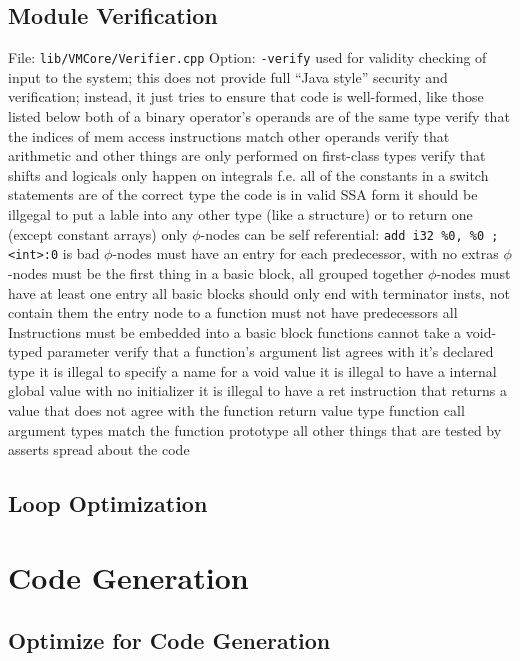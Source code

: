 \documentclass{myproc}
\begin{document}
\subsection{Module Verification}
\bit
\w File: \verb+lib/VMCore/Verifier.cpp+
\w Option: \verb+-verify+
\w used for validity checking of input to the system; this does not provide
full ``Java style'' security and verification; instead, it just tries to
ensure that code is well-formed, like those listed below
\eit
  \ben
  \w both of a binary operator's operands are of the same type
  \w verify that the indices of mem access instructions match other operands
  \w verify that arithmetic and other things are only performed on first-class
  types 
  \w verify that shifts and logicals only happen on integrals f.e.
  \w all of the constants in a switch statements are of the correct type
  \w the code is in valid SSA form
  \w it should be illgegal to put a lable into any other type (like a
  structure) or to return one (except constant arrays)
  \w only $\phi$-nodes can be self referential:
  \verb+add i32 %0, %0 ; <int>:0+ is bad 
  \w $\phi$-nodes must have an entry for each predecessor, with no extras
  \w $\phi$-nodes must be the first thing in a basic block, all grouped together
  \w $\phi$-nodes must have at least one entry
  \w all basic blocks should only end with terminator insts, not contain them
  \w the entry node to a function must not have predecessors
  \w all Instructions must be embedded into a basic block
  \w functions cannot take a void-typed parameter
  \w verify that a function's argument list agrees with it's declared type
  \w it is illegal to specify a name for a void value
  \w it is illegal to have a internal global value with no initializer
  \w it is illegal to have a ret instruction that returns a value that does
  not agree with the function return value type
  \w function call argument types match the function prototype
  \w all other things that are tested by asserts spread about the code
  \een


\subsection{Loop Optimization}


\section{Code Generation}
\subsection{Optimize for Code Generation}
\end{document}
